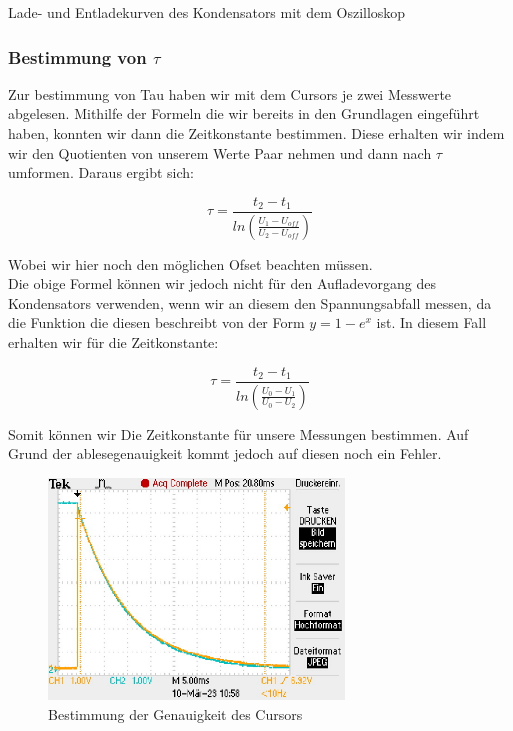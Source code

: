 \documentclass[twoside]{protokoll}
\begin{document}
\begin{aufgabe}{Lade- und Entladekurven des Kondensators mit dem Oszilloskop}
\subsubsection{Bestimmung von $\tau$}

Zur bestimmung von Tau haben wir mit dem Cursors je zwei Messwerte abgelesen. 
Mithilfe der Formeln die wir bereits in den Grundlagen eingeführt haben, konnten wir dann die Zeitkonstante bestimmen. 
Diese erhalten wir indem wir den Quotienten von unserem Werte Paar nehmen und dann nach $\tau$ umformen. Daraus ergibt sich:


\begin{equation}
	\tau = \frac{t_2 - t_1}{ln\left(\frac{U_1-U_{off}}{U_2-U_{off}}\right)}	
\end{equation}

Wobei wir hier noch den möglichen Ofset beachten müssen. \\
Die obige Formel können wir jedoch nicht für den Aufladevorgang des Kondensators verwenden, wenn wir an diesem den Spannungsabfall messen, da die Funktion die diesen beschreibt von der Form $ y = 1 - e^x $ ist. 
In diesem Fall erhalten wir für die Zeitkonstante:
 
 \begin{equation}
 \tau = \frac{t_2 - t_1}{ln\left(\frac{U_0 - U_1}{U_0 - U_2}\right)}
\end{equation}

Somit können wir Die Zeitkonstante für unsere Messungen bestimmen. Auf Grund der ablesegenauigkeit kommt jedoch auf diesen noch ein Fehler.  \\

 
\begin{figure}[H]
  \centering
    \includegraphics[width=0.7\textwidth]{Bilder_Osziloskop/osziloskop-test-cursor-genauigkeit.pdf}
    \caption{Bestimmung der Genauigkeit des Cursors}
  \centering
\end{figure}



\end{aufgabe}
\end{document}
